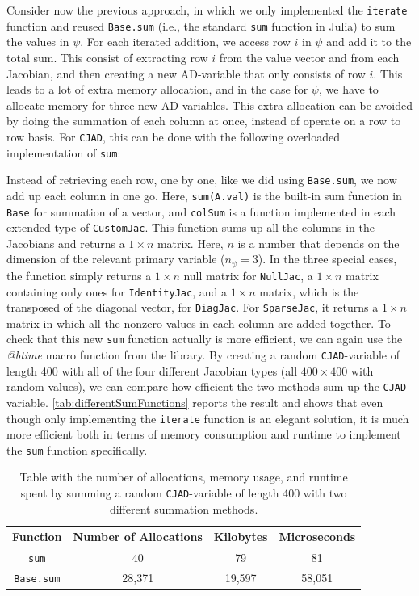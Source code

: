 Consider now the previous approach, in which we only implemented the \texttt{iterate} function and reused \texttt{Base.sum} (i.e., the standard \texttt{sum} function in Julia) to sum the values in $\psi$. For each iterated addition, we access row $i$ in $\psi$ and add it to the total sum. This consist of extracting row $i$ from the value vector and from each Jacobian, and then creating a new AD-variable that only consists of row $i$. This leads to a lot of extra memory allocation, and in the case for $\psi$, we have to allocate memory for three new AD-variables. This extra allocation can be avoided by doing the summation of each column at once, instead of operate on a row to row basis. For \texttt{CJAD}, this can be done with the following overloaded implementation of \texttt{sum}:

Instead of retrieving each row, one by one, like we did using \texttt{Base.sum}, we now add up each column in one go. Here, \texttt{sum(A.val)} is the built-in sum function in \texttt{Base} for summation of a vector, and \texttt{colSum} is a function implemented in each extended type of \texttt{CustomJac}. This function sums up all the columns in the Jacobians and returns a $1\times n$ matrix. Here, $n$ is a number that depends on the dimension of the relevant primary variable ($n_\psi = 3$). In the three special cases, the function simply returns a $1\times n$ null matrix for \texttt{NullJac}, a $1\times n$ matrix containing only ones for \texttt{IdentityJac}, and a $1\times n$ matrix, which is the transposed of the diagonal vector, for \texttt{DiagJac}.  For \texttt{SparseJac}, it returns a $1\times n$ matrix in which all the nonzero values in each column are added together. To check that this new \texttt{sum} function actually is more efficient, we can again use the \textit{@btime} macro function from the \emph{\cite{BenchmarkTools}} library. By creating a random \texttt{CJAD}-variable of length 400 with all of the four different Jacobian types (all $400\times 400$ with random values), we can compare how efficient the two methods sum up the \texttt{CJAD}-variable. \autoref{tab:differentSumFunctions} reports the  result and shows that even though only implementing the \texttt{iterate} function is an elegant solution, it is much more efficient both in terms of memory consumption and runtime to implement the \texttt{sum} function specifically.

\begin{table}[H]
    \centering
    \caption{Table with the number of allocations, memory usage, and runtime spent by summing a random \texttt{CJAD}-variable of length 400 with two different summation methods.}
    \label{tab:differentSumFunctions}
    \def\arraystretch{1.5}
    \begin{tabular}{cccc}
    \textbf{Function} & \textbf{Number of Allocations} & \textbf{Kilobytes} & \textbf{Microseconds} \\
        \hline
         \texttt{sum} & 40 & 79 & 81 \\  
         \texttt{Base.sum} & 28,371 & 19,597 & 58,051\\ 
         \hline
    \end{tabular}
\end{table}


